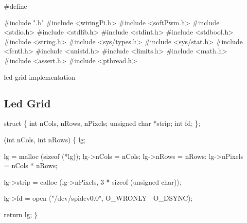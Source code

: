 \documentclass[abstracton,10pt]{scrartcl}%
\begin{document}
\nwenddocs{}\endmoddef\nwstartdeflinemarkup\nwenddeflinemarkup
#define 

#include ".h"
#include <wiringPi.h>
#include <softPwm.h>
#include <stdio.h>
#include <stdlib.h>
#include <stdint.h>
#include <stdbool.h>
#include <string.h>
#include <sys/types.h>
#include <sys/stat.h>
#include <fcntl.h>
#include <unistd.h>
#include <limits.h>
#include <math.h>
#include <assert.h>
#include <pthread.h>

\LA{}led grid implementation~{\nwtagstyle{}}\RA{}

\nwendcode{}\nwdocspar
\subsection{Led Grid}

\nwenddocs{}\endmoddef\nwstartdeflinemarkup{}\nwenddeflinemarkup
struct  \{
    int nCols, nRows, nPixels;
    unsigned char *strip;
    int fd;
\};

  (int nCols, int nRows) \{
     lg;

    lg = malloc (sizeof (*lg));
    lg->nCols = nCols;
    lg->nRows = nRows;
    lg->nPixels = nCols * nRows;

    lg->strip = calloc (lg->nPixels, 3 * sizeof (unsigned char));

    lg->fd = open ("/dev/spidev0.0", O_WRONLY | O_DSYNC);

    return lg;
\}
\end{document}
